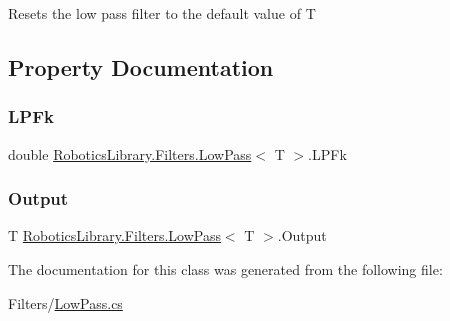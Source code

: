 Resets the low pass filter to the default value of {\ttfamily T} 



\subsection{Property Documentation}
\mbox{\label{class_robotics_library_1_1_filters_1_1_low_pass_aa10538fde21bb3d7a4c5640b615c4013}} 
\subsubsection{\texorpdfstring{L\+P\+Fk}{LPFk}}
{\footnotesize\ttfamily double \hyperlink{class_robotics_library_1_1_filters_1_1_low_pass}{Robotics\+Library.\+Filters.\+Low\+Pass}$<$ T $>$.L\+P\+Fk\hspace{0.3cm}{\ttfamily [get]}}

\mbox{\label{class_robotics_library_1_1_filters_1_1_low_pass_a83f66e4bfd6737c56614f3bb9a73876f}} 
\subsubsection{\texorpdfstring{Output}{Output}}
{\footnotesize\ttfamily T \hyperlink{class_robotics_library_1_1_filters_1_1_low_pass}{Robotics\+Library.\+Filters.\+Low\+Pass}$<$ T $>$.Output\hspace{0.3cm}{\ttfamily [get]}}



The documentation for this class was generated from the following file\+:\begin{DoxyCompactItemize}
\item 
Filters/\hyperlink{_low_pass_8cs}{Low\+Pass.\+cs}\end{DoxyCompactItemize}
